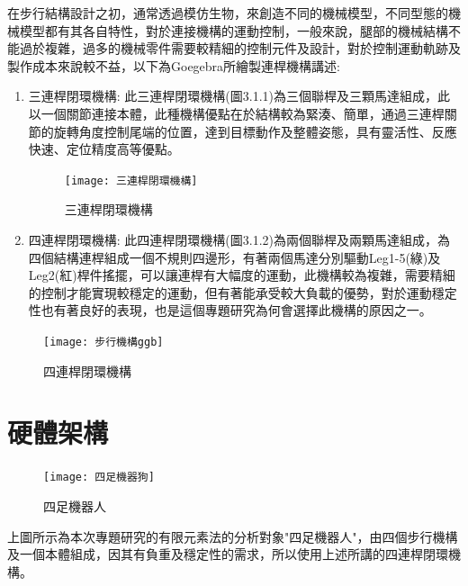 在步行結構設計之初，通常透過模仿生物，來創造不同的機械模型，不同型態的機械模型都有其各自特性，對於連接機構的運動控制，一般來說，腿部的機械結構不能過於複雜，過多的機械零件需要較精細的控制元件及設計，對於控制運動軌跡及製作成本來說較不益，以下為Goegebra所繪製連桿機構講述:\
\begin{enumerate}
\item 三連桿閉環機構:
此三連桿閉環機構(圖3.1.1)為三個聯桿及三顆馬達組成，此以一個關節連接本體，此種機構優點在於結構較為緊湊、簡單，通過三連桿關節的旋轉角度控制尾端的位置，達到目標動作及整體姿態，具有靈活性、反應快速、定位精度高等優點。\

\begin{figure}[hbt!]
\begin{center}
\texttt{[image: 三連桿閉環機構]}
\caption{\Large 三連桿閉環機構}\label{三連桿閉環機構}
\end{center}
\end{figure}
\newpage

\item 四連桿閉環機構:
此四連桿閉環機構(圖3.1.2)為兩個聯桿及兩顆馬達組成，為四個結構連桿組成一個不規則四邊形，有著兩個馬達分別驅動Leg1-5(綠)及Leg2(紅)桿件搖擺，可以讓連桿有大幅度的運動，此機構較為複雜，需要精細的控制才能實現較穩定的運動，但有著能承受較大負載的優勢，對於運動穩定性也有著良好的表現，也是這個專題研究為何會選擇此機構的原因之一。
\end{enumerate}

\begin{figure}[hbt!]
\begin{center}
\texttt{[image: 步行機構ggb]}
\caption{\Large 四連桿閉環機構}\label{GeoGebra步行機構}
\end{center}
\end{figure}
\newpage

\section{硬體架構}

\begin{figure}[hbt!]
\begin{center}
\texttt{[image: 四足機器狗]}
\caption{\Large 四足機器人}\label{四足機器狗}
\end{center}
\end{figure}
上圖所示為本次專題研究的有限元素法的分析對象"四足機器人"，由四個步行機構及一個本體組成，因其有負重及穩定性的需求，所以使用上述所講的四連桿閉環機構。\
\newpage

